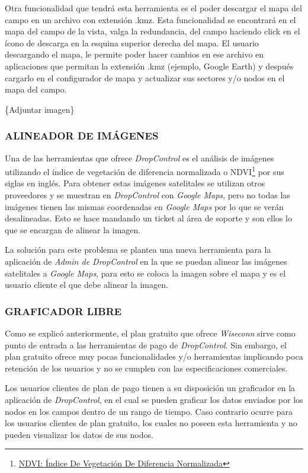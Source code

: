 Otra funcionalidad que tendrá esta herramienta es el poder descargar el mapa del campo en un archivo con extensión .kmz. Esta funcionalidad se encontrará en el mapa del campo de la vista, valga la redundancia, del campo haciendo click en el ícono de descarga en la esquina superior derecha del mapa. El usuario descargando el mapa, le permite poder hacer cambios en ese archivo en aplicaciones que permitan la extensión .kmz (ejemplo, Google Earth) y después cargarlo en el configurador de mapa y actualizar sus sectores y/o nodos en el mapa del campo.

\{Adjuntar imagen\}

\subsubsection{ALINEADOR DE IMÁGENES}

Una de las herramientas que ofrece \textit{DropControl} es el análisis de imágenes utilizando 
el índice de vegetación de diferencia normalizada o NDVI\footnote{\href{https://eos.com/es/make-an-analysis/ndvi/}{NDVI: Índice De Vegetación De Diferencia Normalizada}} por sus siglas en inglés. Para obtener estas imágenes satelitales
se utilizan otros proveedores y se muestran en \textit{DropControl} con \textit{Google Maps}, pero no todas las imágenes tienen
las mismas coordenadas en \textit{Google Maps} por lo que se verán desalineadas. Esto se hace mandando un ticket al área de soporte
y son ellos lo que se encargan de alinear la imagen.

La solución para este problema se plantea una nueva herramienta para la aplicación de \textit{Admin de DropControl} en la que 
se puedan alinear las imágenes satelitales a \textit{Google Maps}, para esto se coloca la imagen sobre el mapa y es el usuario cliente
el que debe alinear la imagen.

\subsubsection{GRAFICADOR LIBRE}

Como se explicó anteriormente, el plan gratuito que ofrece \textit{Wiseconn} sirve como punto de entrada a las herramientas
de pago de \textit{DropControl}. Sin embargo, el plan gratuito ofrece muy pocas funcionalidades y/o herramientas
implicando poca retención de los usuarios y no se cumplen con las especificaciones comerciales.

Los usuarios clientes de plan de pago tienen a su disposición un graficador en la aplicación de \textit{DropControl}, en el cual
se pueden graficar los datos enviados por los nodos en los campos dentro de un rango de tiempo.
Caso contrario ocurre para los usuarios clientes de plan gratuito, los cuales no poseen esta herramienta y 
no pueden visualizar los datos de sus nodos.

